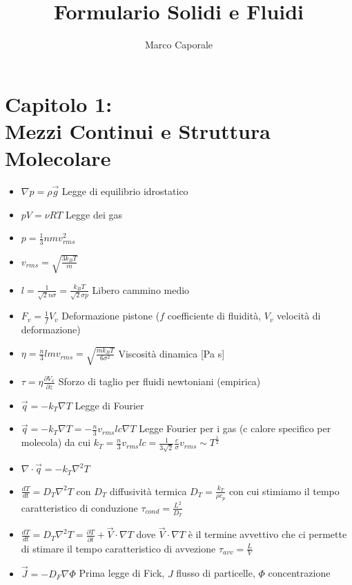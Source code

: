 \documentclass[a4paper]{article}
\begin{document}
	\title{Formulario Solidi e Fluidi}
	\author{Marco Caporale}
	\maketitle

\section{Capitolo 1:\\ Mezzi Continui e Struttura Molecolare}
\begin{itemize}
	\item $\nabla p = \rho \overrightarrow{g}$ Legge di equilibrio idrostatico
	\item $pV = \nu RT$ Legge dei gas
	\item $p = \frac{1}{3} nm v_{rms}^2$
	\item $v_{rms} = \sqrt{\frac{3k_B T}{m}}$
	\item $\textit{l} = \frac{1}{\sqrt{2} n \sigma} = \frac{k_B T}{\sqrt{2} \sigma p}$ Libero cammino medio
	\item $F_v = \frac{1}{f} V_v$ Deformazione pistone ($f$ coefficiente di fluidità, $V_v$ velocità di deformazione)
	\item $\eta = \frac{n}{3}lmv_{rms} = \sqrt{\frac{mk_BT}{6 \sigma^2}}$  Viscosità dinamica [Pa s]
	\item $\tau = \eta \frac{\partial V_x}{\partial z}$ Sforzo di taglio per fluidi newtoniani (empirica)
	\item $\overrightarrow{q} = -k_T \nabla T$ Legge di Fourier
	\item $\overrightarrow{q} = -k_T \nabla T = -\frac{n}{3} v_{rms} l c \nabla T$ Legge Fourier per i gas (c calore specifico per molecola) da cui $k_T = \frac{n}{3} v_{rms}lc =\frac{1}{3 \sqrt{2}} \frac{c}{\sigma} v_{rms} \sim T^{\frac{1}{2}}$
	\item $\nabla \cdot \overrightarrow{q} = -k_T \nabla^2 T$
	\item $\frac{dT}{dt}=D_T \nabla^2 T$ con $D_T$ diffusività termica $D_T = \frac{k_T}{\rho c_p}$ con cui stimiamo il tempo caratteristico di conduzione $\tau_{cond} = \frac{L^2}{D_T}$
	\item $\frac{dT}{dt}=D_T \nabla^2 T = \frac{\partial T}{\partial t} + \overrightarrow{V} \cdot \nabla T$ dove $\overrightarrow{V} \cdot \nabla T$ è il termine avvettivo che ci permette di stimare il tempo caratteristico di avvezione $\tau_{avv} = \frac{L}{V}$
	\item $\overrightarrow{J} = -D_F \nabla \Phi$ Prima legge di Fick, $J$ flusso di particelle, $\Phi$ concentrazione

\end{itemize}
\end{document}
